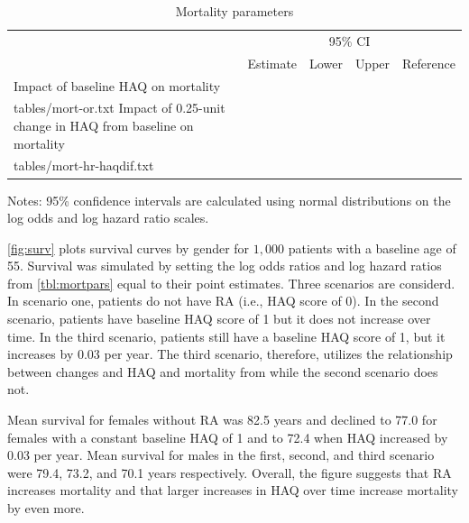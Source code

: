 \documentclass[11pt,final,fleqn]{article}
\makeatletter
\theoremstyle{plain}
\newcommand*\ExpandableInput[1]{\@@input#1 }
\makeatother
\begin{document}
\begin{table}[!ht]
\begin{center}
\begin{threeparttable}
\caption{Mortality parameters} \label{tbl:mortpars}
\footnotesize
\begin{tabularx}{\textwidth}{@{\extracolsep{\fill}}lcccc}
\hline
\multicolumn{2}{l}{} & \multicolumn{2}{c}{95\% CI} & \multicolumn{1}{l}{} \\
\cmidrule{3-4} 
\multicolumn{1}{l}{} & \multicolumn{1}{l}{Estimate} & \multicolumn{1}{c}{Lower} & \multicolumn{1}{c}{Upper} & \multicolumn{1}{c}{Reference} \\
\hline
Impact of baseline HAQ on mortality \\
\ExpandableInput{tables/mort-or.txt}
Impact of 0.25-unit change in HAQ from baseline on mortality\\
\ExpandableInput{tables/mort-hr-haqdif.txt}
\hline
\end{tabularx}
\scriptsize
Notes: 95\% confidence intervals are calculated using normal distributions on the log odds
and log hazard ratio scales. 
\end{threeparttable}
\end{center}
\end{table}


\autoref{fig:surv} plots survival curves by gender for $1,000$ patients with a baseline age of 55. Survival was simulated by setting the log odds ratios and log hazard ratios from \autoref{tbl:mortpars} equal to their point estimates. Three scenarios are considerd. In scenario one, patients do not have RA (i.e., HAQ score of 0). In the second scenario, patients have baseline HAQ score of 1 but it does not increase over time. In the third scenario, patients still have a baseline HAQ score of 1, but it increases by 0.03 per year. The third scenario, therefore, utilizes the relationship between changes and HAQ and mortality from \citet{michaud2012mortality} while the second scenario does not. 

Mean survival for females without RA was 82.5 years and declined to 77.0 for females with a constant baseline HAQ of 1 and to 72.4 when HAQ increased by 0.03 per year. Mean survival for males in the first, second, and third scenario were 79.4, 73.2, and 70.1 years respectively. Overall, the figure suggests that RA increases mortality and that larger increases in HAQ over time increase mortality by even more.
\end{document}
